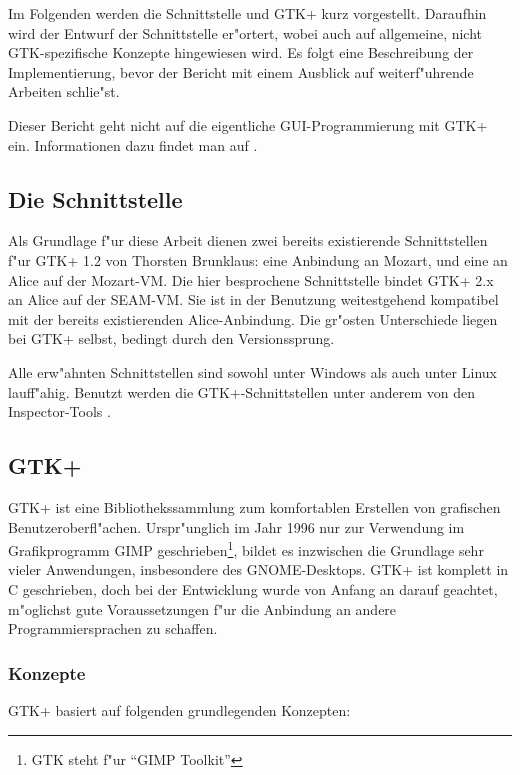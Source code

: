 \documentclass[a4paper,titlepage]{article}
\begin{document}
Im Folgenden werden die Schnittstelle und GTK+ kurz vorgestellt.
Daraufhin wird der Entwurf der Schnittstelle er"ortert, wobei auch auf
allgemeine, nicht GTK-spezifische Konzepte hingewiesen wird.
Es folgt eine Beschreibung der Implementierung, bevor der Bericht mit einem
Ausblick auf weiterf"uhrende Arbeiten schlie"st.

Dieser Bericht geht nicht auf die eigentliche GUI-Programmierung mit GTK+ ein.
Informationen dazu findet man auf \cite{wwwgtkorg}.

\subsection{Die Schnittstelle}

Als Grundlage f"ur diese Arbeit dienen zwei bereits existierende
Schnittstellen f"ur GTK+ 1.2 von Thorsten Brunklaus:
eine Anbindung an Mozart, und eine an Alice auf der Mozart-VM.
Die hier besprochene Schnittstelle bindet GTK+ 2.x an Alice auf der SEAM-VM.
Sie ist in der Benutzung weitestgehend kompatibel mit der bereits existierenden
Alice-Anbindung. Die gr"osten Unterschiede liegen bei GTK+ selbst,
bedingt durch den Versionssprung.

Alle erw"ahnten Schnittstellen sind sowohl unter Windows als auch unter
Linux lauff"ahig. Benutzt werden die GTK+-Schnittstellen unter anderem von
den Inspector-Tools \cite{inspector}.

\subsection{GTK+}

GTK+ ist eine Bibliothekssammlung zum komfortablen Erstellen von grafischen
Benutzeroberfl"achen. Urspr"unglich im Jahr 1996 nur zur Verwendung im
Grafikprogramm GIMP geschrieben\footnote{GTK steht f"ur ``GIMP Toolkit''}, 
bildet es
inzwischen die Grundlage sehr vieler Anwendungen, insbesondere des 
GNOME-Desktops. GTK+ ist komplett
in C geschrieben, doch bei der Entwicklung wurde von Anfang an darauf geachtet,
m"oglichst gute Voraussetzungen f"ur die Anbindung an andere
Programmiersprachen zu schaffen.

\subsubsection*{Konzepte} 
GTK+ basiert auf folgenden grundlegenden Konzepten:
\end{document}
